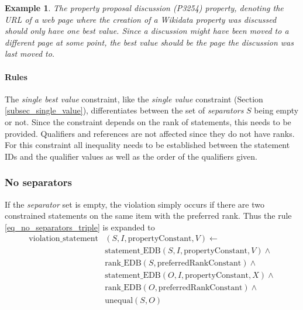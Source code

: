 \documentclass[hyperref,bachelorofscience,fleqn]{cgvpub}
\newtheorem{example}{Example}
\begin{document}
\begin{example}
The \emph{property proposal discussion} (P3254) property, denoting the URL of a web page where the creation of a Wikidata property was discussed should only have one best value. Since a discussion might have been moved to a different page at some point, the best value should be the page the discussion was last moved to.
\end{example}

\paragraph{Rules}
The \emph{single best value} constraint, like the \emph{single value} constraint (Section \ref{subsec_single_value}), differentiates between the set of \emph{separators} \(S\) being empty or not. Since the constraint depends on the rank of statements, this needs to be provided. Qualifiers and references are not affected since they do not have ranks. For this constraint all inequality needs to be established between the statement IDs and the qualifier values as well as the order of the qualifiers given.\\

\subsubsection{No separators}
If the \emph{separator} set is empty, the violation simply occurs if there are two constrained statements on the same item with the preferred rank. Thus the rule \eqref{eq_no_separators_triple} is expanded to
\begin{equation*}
\begin{split}
\text{violation\_statement}&(S, I, \text{propertyConstant}, V) \leftarrow \\
&\text{statement\_EDB}(S, I, \text{propertyConstant}, V) \wedge{} \\
&\text{rank\_EDB}(S, \text{preferredRankConstant}) \wedge{} \\
&\text{statement\_EDB}(O, I, \text{propertyConstant}, X) \wedge{} \\
&\text{rank\_EDB}(O, \text{preferredRankConstant}) \wedge{} \\
&\text{unequal}(S, O)
\end{split}
\end{equation*}
\end{document}
